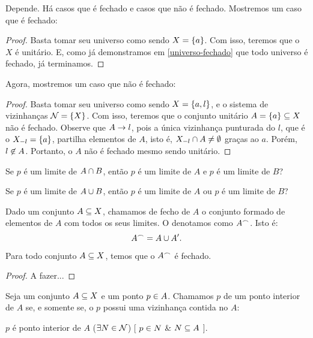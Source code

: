 \documentclass[a4paper,12pt,oneside]{book}
\begin{document}
\begin{answer}
	Depende. Há casos que é fechado e casos que não é fechado. Mostremos um caso que é fechado:
	\begin{proof}	
		Basta tomar seu universo como sendo $X = \left\{a\right\}$. Com isso, teremos que o $X$ é unitário. E, como já demonstramos em \ref{universo-fechado} que todo universo é fechado, já terminamos. 
	\end{proof}
	Agora, mostremos um caso que não é fechado:
	\begin{proof}
		Basta tomar seu universo como sendo $X = \left\{a,l\right\}$, e o sistema de vizinhanças $\mathcal{N} = \left\{X\right\}$. Com isso, teremos que o conjunto unitário $A = \left\{a\right\} \subseteq X$ não é fechado. Observe que $A \rightarrow l$, pois a única vizinhança punturada do $l$, que é o $X_{-l} = \left\{a\right\}$, partilha elementos de $A$, isto é, $X_{-l} \cap A \neq \emptyset$ graças ao $a$. Porém, $l \not\in A$. Portanto, o $A$ não é fechado mesmo sendo unitário.
	\end{proof}
\end{answer}

\begin{question}
	Se $p$ é um limite de $A \cap B$, então $p$ é um limite de $A$ e $p$ é um limite de $B$?
\end{question}

\begin{question}
	Se $p$ é um limite de $A \cup B$, então $p$ é um limite de $A$ ou $p$ é um limite de $B$?
\end{question}

\begin{definition}
	\label{def:fecho}
	Dado um conjunto $A \subseteq X$, chamamos de fecho de $A$ o conjunto formado de elementos de $A$ com todos os seus limites. O denotamos como $A^{\frown}$. Isto é:
	\[
		A^{\frown} = A \cup A^{\prime}.
	\]
\end{definition}

\begin{theorem}
	\label{thm:fecho-fechado}
	Para todo conjunto $A \subseteq X$, temos que o $A^{\frown}$ é fechado.
\end{theorem}

\begin{proof}
	A fazer...
\end{proof}

\begin{definition}
	\label{def:ponto-interior}
	Seja um conjunto $A \subseteq X$ e um ponto $p \in A$. Chamamos $p$ de um ponto interior de $A$ se, e somente se, o $p$ possui uma vizinhança contida no $A$:
	\begin{center}
		$p$ é ponto interior de $A$ \sse
			($\exists N \in \mathcal{N}$)%
			[ $p \in N$ \& $N \subseteq A$ ].
	\end{center}
\end{definition}
\end{document}
